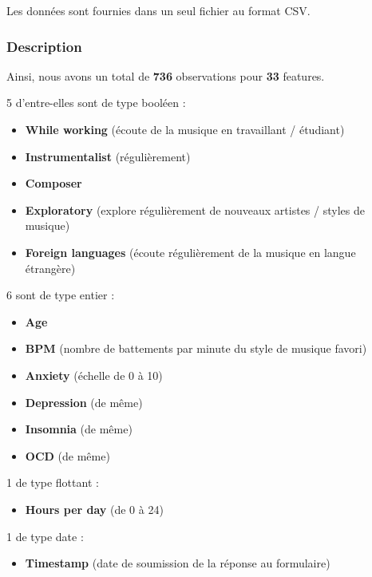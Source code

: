 \documentclass[
]{article}
\providecommand{\tightlist}{%
  \setlength{\itemsep}{0pt}\setlength{\parskip}{0pt}}
\begin{document}
Les données sont fournies dans un seul fichier au format CSV.

\hypertarget{description}{%
\subsubsection{Description}\label{description}}

Ainsi, nous avons un total de \textbf{736} observations pour \textbf{33}
features.

5 d'entre-elles sont de type booléen :

\begin{itemize}
\tightlist
\item
  \textbf{While working} (écoute de la musique en travaillant /
  étudiant)
\item
  \textbf{Instrumentalist} (régulièrement)
\item
  \textbf{Composer}
\item
  \textbf{Exploratory} (explore régulièrement de nouveaux artistes /
  styles de musique)
\item
  \textbf{Foreign languages} (écoute régulièrement de la musique en
  langue étrangère)
\end{itemize}

6 sont de type entier :

\begin{itemize}
\tightlist
\item
  \textbf{Age}
\item
  \textbf{BPM} (nombre de battements par minute du style de musique
  favori)
\item
  \textbf{Anxiety} (échelle de 0 à 10)
\item
  \textbf{Depression} (de même)
\item
  \textbf{Insomnia} (de même)
\item
  \textbf{OCD} (de même)
\end{itemize}

1 de type flottant :

\begin{itemize}
\tightlist
\item
  \textbf{Hours per day} (de 0 à 24)
\end{itemize}

1 de type date :

\begin{itemize}
\tightlist
\item
  \textbf{Timestamp} (date de soumission de la réponse au formulaire)
\end{itemize}
\end{document}
